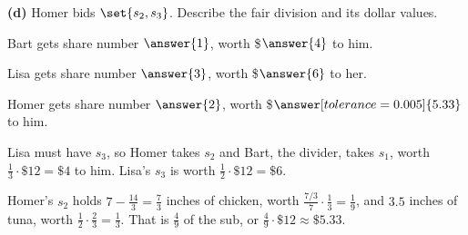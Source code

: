 \documentclass[12pt]{ximera}
\begin{document}
\begin{problem}
\begin{prompt}
\textbf{(d)} Homer bids $\set{s_2,s_3}$. Describe the fair division and its dollar values.

Bart gets share number $\answer{1}$, worth \$$\answer{4}$ to him.

\smallskip
Lisa gets share number $\answer{3}$, worth \$$\answer{6}$ to her.

\smallskip
Homer gets share number $\answer{2}$, worth \$$\answer[tolerance=0.005]{5.33}$ to him.
\begin{feedback}
Lisa must have $s_3$, so Homer takes $s_2$ and Bart, the divider, takes $s_1$, worth
$\frac13\cdot\$12=\$4$ to him. Lisa's $s_3$ is worth $\frac12\cdot\$12=\$6$.

Homer's $s_2$ holds $7-\frac{14}3=\frac73$ inches of chicken, worth
$\frac{7/3}{7}\cdot\frac13=\frac19$, and $3.5$ inches of tuna, worth
$\frac12\cdot\frac23=\frac13$. That is $\frac49$ of the sub, or
$\frac49\cdot\$12\approx\$5.33$.
\end{feedback}
\end{prompt}
\end{problem}
\end{document}
